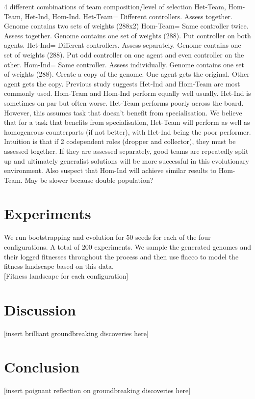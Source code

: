 \documentclass[sigconf]{aamas}  %
\begin{document}
4 different combinations of team composition/level of selection
Het-Team, Hom-Team, Het-Ind, Hom-Ind.
Het-Team= Different controllers. Assess together. Genome contains two sets of weights (288x2)
Hom-Team= Same controller twice. Assess together. Genome contains one set of weights (288). Put controller on both agents.
Het-Ind= Different controllers. Assess separately. Genome contains one set of weights (288). Put odd controller on one agent and even controller on the other.
Hom-Ind= Same controller. Assess individually. Genome contains one set of weights (288). Create a copy of the genome. One agent gets the original. Other agent gets the copy. 
Previous study suggests Het-Ind and Hom-Team are most commonly used.
Hom-Team and Hom-Ind perform equally well usually. Het-Ind is sometimes on par but often worse. Het-Team performs poorly across the board.
However, this assumes task that doesn’t benefit from specialisation. 
We believe that for a task that benefits from specialisation, Het-Team will perform as well as homogeneous counterparts (if not better), with Het-Ind being the poor performer.
Intuition is that if 2 codependent roles (dropper and collector), they must be assessed together. If they are assessed separately, good teams are repeatedly split up and ultimately generalist solutions will be more successful in this evolutionary environment.
Also suspect that Hom-Ind will achieve similar results to Hom-Team. May be slower because double population?

\section{Experiments}

We run bootstrapping and evolution for 50 seeds for each of the four configurations. A total of 200 experiments. 
We sample the generated genomes and their logged fitnesses throughout the process and then use flacco to model the fitness landscape based on this data.\\

[Fitness landscape for each configuration]

\section{Discussion}

[insert brilliant groundbreaking discoveries here]

\section{Conclusion}

[insert poignant reflection on groundbreaking discoveries here]


\balance  %
\end{document}
